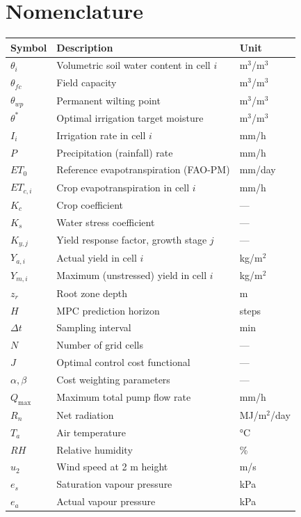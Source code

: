 \documentclass[12pt, a4paper]{report}
\begin{document}
\appendix
\chapter{Nomenclature}

\begin{longtable}{lll}
\toprule
\textbf{Symbol} & \textbf{Description} & \textbf{Unit} \\
\midrule
$\theta_i$ & Volumetric soil water content in cell $i$ & m$^3$/m$^3$ \\
$\theta_{fc}$ & Field capacity & m$^3$/m$^3$ \\
$\theta_{wp}$ & Permanent wilting point & m$^3$/m$^3$ \\
$\theta^*$ & Optimal irrigation target moisture & m$^3$/m$^3$ \\
$I_i$ & Irrigation rate in cell $i$ & mm/h \\
$P$ & Precipitation (rainfall) rate & mm/h \\
$ET_0$ & Reference evapotranspiration (FAO-PM) & mm/day \\
$ET_{c,i}$ & Crop evapotranspiration in cell $i$ & mm/h \\
$K_c$ & Crop coefficient & — \\
$K_s$ & Water stress coefficient & — \\
$K_{y,j}$ & Yield response factor, growth stage $j$ & — \\
$Y_{a,i}$ & Actual yield in cell $i$ & kg/m$^2$ \\
$Y_{m,i}$ & Maximum (unstressed) yield in cell $i$ & kg/m$^2$ \\
$z_r$ & Root zone depth & m \\
$H$ & MPC prediction horizon & steps \\
$\Delta t$ & Sampling interval & min \\
$N$ & Number of grid cells & — \\
$J$ & Optimal control cost functional & — \\
$\alpha, \beta$ & Cost weighting parameters & — \\
$Q_{\max}$ & Maximum total pump flow rate & mm/h \\
$R_n$ & Net radiation & MJ/m$^2$/day \\
$T_a$ & Air temperature & °C \\
$RH$ & Relative humidity & \% \\
$u_2$ & Wind speed at 2 m height & m/s \\
$e_s$ & Saturation vapour pressure & kPa \\
$e_a$ & Actual vapour pressure & kPa \\
\bottomrule
\end{longtable}
\end{document}
